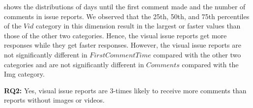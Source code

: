 shows the distributions of days until the first comment made and the number of comments in issue reports. 
We observed that the 25th, 50th, and 75th percentiles of 
the $Vid$ category in 
this dimension
result in the largest or faster values than those of 
the other two categories.
Hence, the visual issue reports get more responses 
while they get faster responses. 
However, the visual issue reports are not 
significantly different in $FirstCommentTime$ 
compared with the other two categories and 
are not significantly different in $Comments$ 
compared with the Img category.

\summarybox
{{\bf RQ2: }{Yes, visual issue reports are 3-times likely to receive more comments than reports without images or videos. }
}









